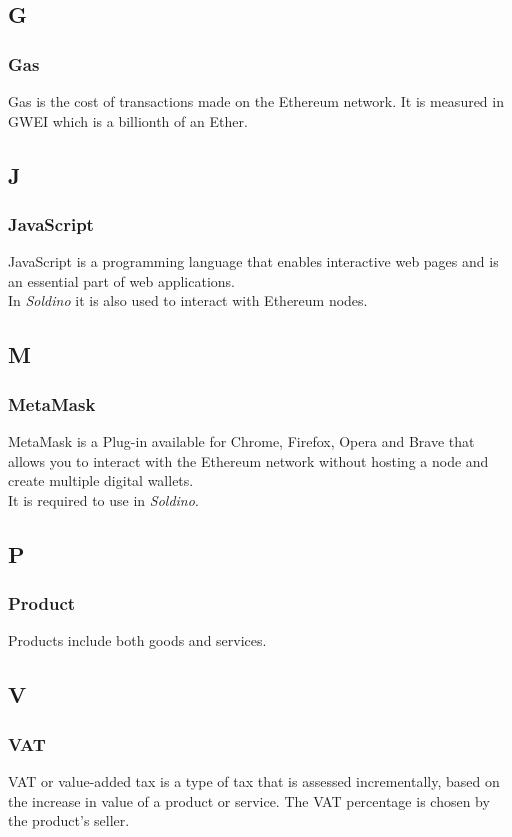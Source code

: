 	\subsection*{G}
		\subsubsection*{Gas}
		Gas is the cost of transactions made on the Ethereum network. It is 
		measured in GWEI which is a billionth of an Ether.
		
	\subsection*{J}
		\subsubsection*{JavaScript}
		JavaScript is a programming language that enables interactive web pages 
		and is an essential part of web applications.\\
		In \textit{Soldino} it is also used to interact with Ethereum nodes.
		
	\subsection*{M}
		\subsubsection*{MetaMask}
		MetaMask is a Plug-in available for Chrome, Firefox, Opera and Brave that 
		allows you to interact with the Ethereum network without hosting a node 
		and create multiple digital wallets\glo.
		\\It is required to use in \textit{Soldino}.
		
	\subsection*{P}
		\subsubsection*{Product}
		Products include both goods and services.
		
	\subsection*{V}
		\subsubsection*{VAT}
		VAT or value-added tax is a type of tax that is assessed incrementally, 
		based on the increase in value of a product or service. The VAT 
		percentage is chosen by the product's seller.